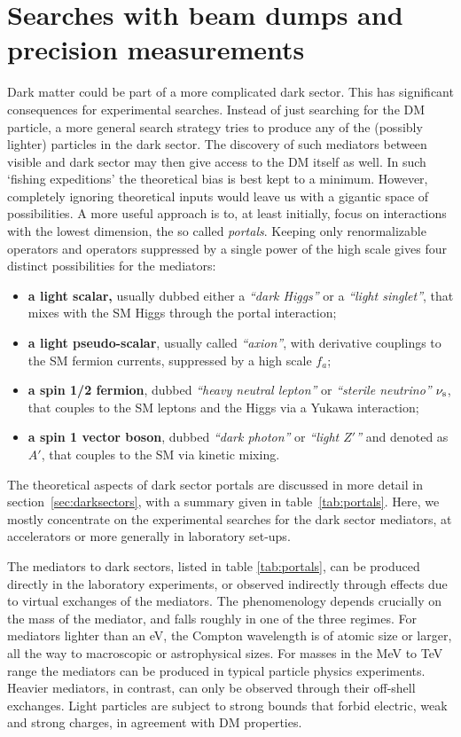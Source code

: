 \section{Searches with beam dumps and precision measurements}
\label{sec:searches:beam:dumps}
Dark matter could be part of a more complicated dark sector. This has significant consequences for experimental searches.
Instead of just searching  for the DM particle, a more general search strategy tries to produce any of the 
(possibly lighter) particles in the dark sector.  
The discovery of such mediators between visible and dark sector may then give access to the DM itself as well. 
In such `fishing expeditions' the theoretical bias is best kept to a minimum. 
However, completely ignoring theoretical inputs would leave us with a  gigantic space of possibilities. 
A more useful approach is to, at least initially, focus on interactions with the lowest dimension, 
the so called {\it portals}. Keeping only renormalizable operators and operators suppressed by a single power of the high scale gives four distinct possibilities for the mediators:
\begin{itemize}
\item[$\circ$] 
{\bf a light scalar,} usually dubbed either a  {\em``dark Higgs''} or a {\em``light singlet''}, that mixes with the SM Higgs through the portal interaction;
\item[$\circ$] {\bf a light pseudo-scalar}, usually called {\em ``axion''},  with derivative couplings to the SM fermion currents, suppressed by a high scale $f_a$;
\item[$\circ$] {\bf a spin 1/2 fermion}, dubbed {\em ``heavy neutral lepton''} or  {\em ``sterile neutrino''} $\nu_{\rm s}$, 
that couples to the SM leptons and the Higgs via a Yukawa interaction; 
\item[$\circ$] {\bf a spin 1 vector boson}, dubbed {\em ``dark photon''} or  {\em ``light $Z'$''} and denoted as $A'$,  that couples to the SM via kinetic mixing.
\end{itemize}
The theoretical aspects of dark sector portals are discussed in more detail in section~\ref{sec:darksectors}, with a summary given in table~\ref{tab:portals}. 
Here, we mostly concentrate on  the experimental searches for the dark sector mediators, at accelerators or more generally in laboratory set-ups. 

The mediators to dark sectors, listed in table \ref{tab:portals}, can be produced directly in the laboratory experiments, or observed indirectly through effects due to virtual exchanges of the mediators. The phenomenology depends crucially on the mass of the mediator, and falls roughly in one of the three regimes. 
For mediators lighter than an eV, the Compton wavelength is of atomic size or larger, all the way to macroscopic or astrophysical sizes. 
For masses in the MeV to TeV range the mediators can be produced in typical particle physics experiments. 
Heavier mediators, in contrast, can only be observed through their off-shell exchanges.
Light particles are subject to strong bounds that forbid electric, weak and strong charges,
in agreement with DM properties.

